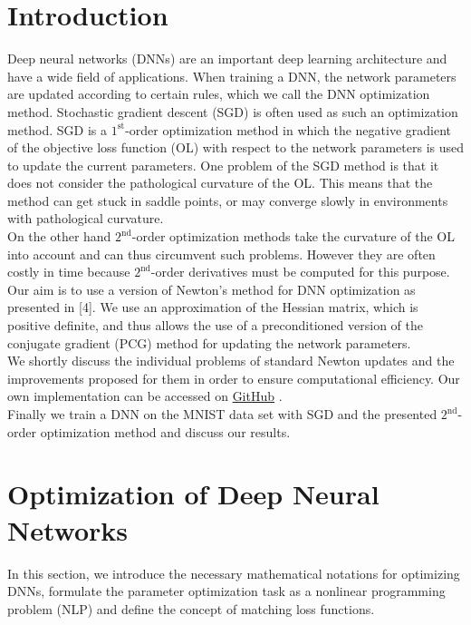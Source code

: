 \documentclass[conference]{IEEEtran}
\begin{document}
	\section{Introduction}
	\noindent
	Deep neural networks (DNNs) are an important deep learning architecture and have a wide field of applications. When training a DNN, the network parameters are updated according to certain rules, which we call the DNN optimization method. Stochastic gradient descent (SGD) is often used as such an optimization method. SGD is a $1^{\text{st}}$-order optimization method in which the negative gradient of the objective loss function (OL) with respect to the network parameters is used to update the current parameters. One problem of the SGD method is that it does not consider the pathological curvature of the OL. This means that the method can get stuck in saddle points, or may converge slowly in environments with pathological curvature.\\
	On the other hand $2^{\text{nd}}$-order optimization methods take the curvature of the OL into account and can thus circumvent such problems. However they are often costly in time because $2^{\text{nd}}$-order derivatives must be computed for this purpose.\\
	Our aim is to use a version of Newton's method for DNN optimization as presented in [4]. We use an approximation of the Hessian matrix, which is positive definite, and thus allows the use of a preconditioned version of the conjugate gradient (PCG) method for updating the network parameters.\\ We shortly discuss the individual problems of standard Newton updates and the improvements proposed for them in order to ensure computational efficiency. Our own implementation can be accessed on \href{https://github.com/NiklasBrunn/Hessian_Free_Optimization_of_Deep_Neural_Networks}{GitHub} .\\
	Finally we train a DNN on the MNIST data set with SGD and the presented $2^{\text{nd}}$-order optimization method and discuss our results.


	\section{Optimization of Deep Neural Networks}
	\noindent
	In this section, we introduce the necessary mathematical notations for optimizing DNNs, formulate the parameter optimization task as a nonlinear programming problem (NLP) and define the concept of matching loss functions.
\end{document}
